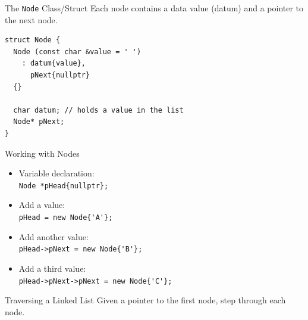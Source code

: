 \documentclass[14pt,aspectratio=1610, hyperref={pdfpagelayout=SinglePage}]{beamer}
\begin{document}
\begin{frame}[fragile]{The \texttt{Node} Class/Struct}
Each node contains a data value (datum) and a pointer to the next node.

\begin{lstlisting}
struct Node {
  Node (const char &value = ' ')
    : datum{value},
      pNext{nullptr}
  {}

  char datum; // holds a value in the list
  Node* pNext;
}
\end{lstlisting}
\end{frame}

\begin{frame}[fragile]{Working with Nodes}
\begin{itemize}
\item<1->
    Variable declaration:\\
    \lstinline|Node *pHead{nullptr};|
\item<3->
    Add a value:\\
    \lstinline|pHead = new Node{'A'};|
\item<5->%
    Add another value:\\
    \lstinline|pHead->pNext = new Node{'B'};|
\item<7->
  Add a third value:\\
  \lstinline|pHead->pNext->pNext = new Node{'C'};|\\
\end{itemize}
\center{}
\end{frame}


\begin{frame}{Traversing a Linked List}
Given a pointer to the first node, step through each node.


\end{frame}
\end{document}
